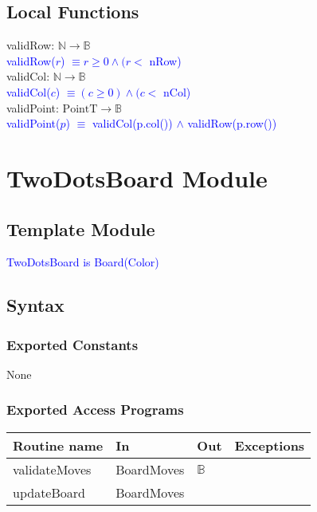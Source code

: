 \documentclass[12pt]{article}
\begin{document}
\subsection*{Local Functions}

\noindent validRow: $\mathbb{N} \rightarrow \mathbb{B}$\\
\noindent \textcolor{blue}{validRow($r$) $\equiv r \geq 0 \land (r < $ nRow)} \\

\noindent validCol: $\mathbb{N} \rightarrow \mathbb{B}$\\
\noindent \textcolor{blue}{validCol($c$) $\equiv (c \geq 0) \land (c < $ nCol)} \\


\noindent validPoint: $\mbox{PointT} \rightarrow \mathbb{B}$\\
\noindent \textcolor{blue}{validPoint($p$) $\equiv$ validCol(p.col()) $\land$ validRow(p.row())}


\newpage

\section* {TwoDotsBoard Module}

\subsection* {Template Module}

\noindent \textcolor{blue}{TwoDotsBoard is Board(Color)}

\subsection* {Syntax}

\subsubsection* {Exported Constants}

None

\subsubsection* {Exported Access Programs}

\begin{tabular}{| l | l | l | p{6cm} |}
\hline
\textbf{Routine name} & \textbf{In} & \textbf{Out} & \textbf{Exceptions}\\
\hline
validateMoves & BoardMoves & $\mathbb{B}$& \\
\hline
updateBoard & BoardMoves &  & \\
\hline
\end{tabular}
\end{document}
